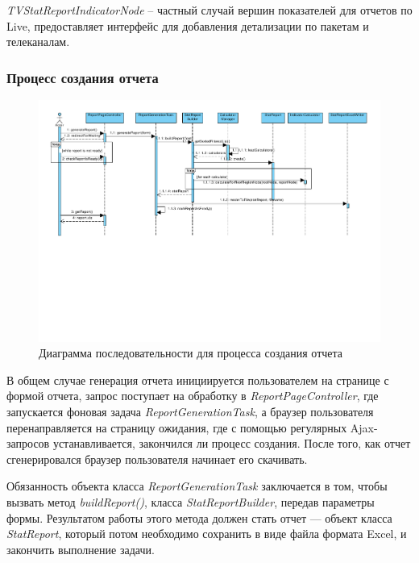 \textit{TVStatReportIndicatorNode} -- частный случай вершин показателей для отчетов по Live, 
предоставляет интерфейс для добавления детализации по пакетам и телеканалам.

\subsubsection{Процесс создания отчета}
\begin{figure}[!ht]
\begin{center}
\vspace{-0.4cm}
\includegraphics[scale=0.60, trim=00mm 90mm 00mm 10mm, clip]{../resources/uml/ReportCreation.pdf}
\caption{Диаграмма последовательности для процесса создания отчета}
\label{gr:report_creation}
\end{center} 
\end{figure}

В общем случае генерация отчета инициируется пользователем на странице с формой отчета, 
запрос поступает на обработку в \textit{ReportPageController}, где запускается фоновая задача
\textit{ReportGenerationTask}, а браузер пользователя перенаправляется на страницу ожидания,
где с помощью регулярных Ajax-запросов устанавливается, закончился ли процесс создания.
После того, как отчет сгенерировался браузер пользователя начинает его скачивать.

Обязанность объекта класса \textit{ReportGenerationTask} заключается в том, чтобы 
вызвать метод \textit{buildReport()}, класса \textit{StatReportBuilder}, передав 
параметры формы. Результатом работы этого метода должен стать отчет --- объект класса \textit{StatReport},
который потом необходимо сохранить в виде файла формата Excel, и закончить выполнение задачи.

